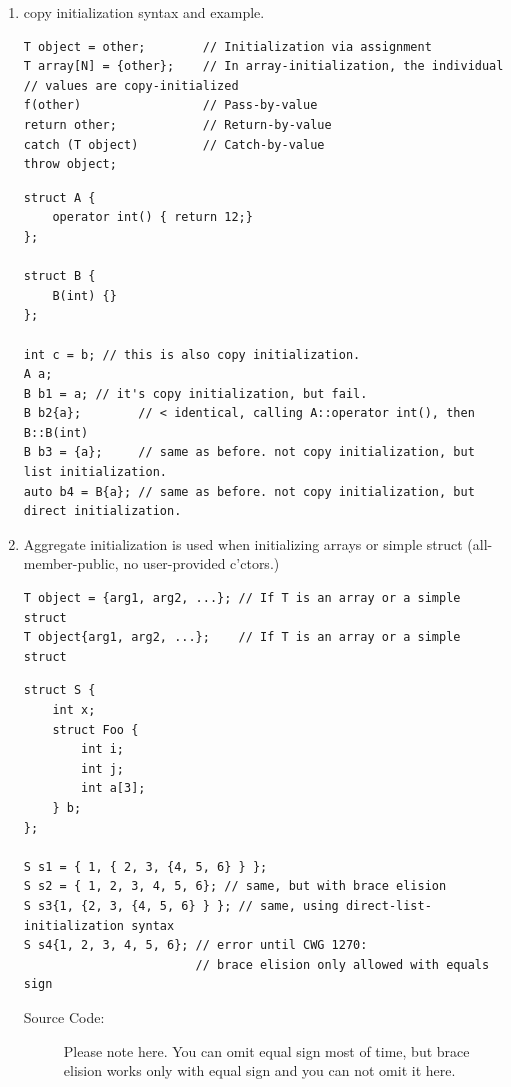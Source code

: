 \documentclass[a4paper,11pt,twoside]{book}
\begin{document}
\begin{itemize}
\begin{enumerate}
		\item copy initialization syntax and example.
\begin{lstlisting}[numbers=none]
T object = other;        // Initialization via assignment
T array[N] = {other};    // In array-initialization, the individual
// values are copy-initialized
f(other)                 // Pass-by-value
return other;            // Return-by-value
catch (T object)         // Catch-by-value
throw object;
\end{lstlisting}

\begin{lstlisting}[numbers=none]
struct A {
	operator int() { return 12;}
};

struct B {
	B(int) {}
};

int c = b; // this is also copy initialization. 
A a;
B b1 = a; // it's copy initialization, but fail. 
B b2{a};        // < identical, calling A::operator int(), then B::B(int)
B b3 = {a};     // same as before. not copy initialization, but list initialization.
auto b4 = B{a}; // same as before. not copy initialization, but direct initialization.
\end{lstlisting}




		\item Aggregate initialization is used when initializing arrays or simple struct (all-member-public, no user-provided c'ctors.)
\begin{lstlisting}[numbers=none]
T object = {arg1, arg2, ...}; // If T is an array or a simple struct
T object{arg1, arg2, ...};    // If T is an array or a simple struct
\end{lstlisting}

\begin{lstlisting}[numbers=none]
struct S {
	int x;
	struct Foo {
		int i;
		int j;
		int a[3];
	} b;
};

S s1 = { 1, { 2, 3, {4, 5, 6} } };
S s2 = { 1, 2, 3, 4, 5, 6}; // same, but with brace elision
S s3{1, {2, 3, {4, 5, 6} } }; // same, using direct-list-initialization syntax
S s4{1, 2, 3, 4, 5, 6}; // error until CWG 1270: 
						// brace elision only allowed with equals sign
\end{lstlisting}

\begin{description}
	\item[Source Code:] Please note here. You can omit equal sign most of time,  but brace elision works only with equal sign and you can not omit it here.  
\end{description}


\end{enumerate}
\end{itemize}
\end{document}
